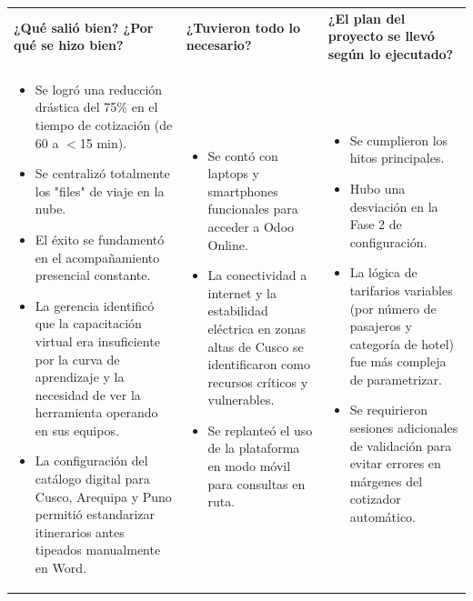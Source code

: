 \documentclass[11pt]{article}
\begin{document}
\begin{longtable}{|p{5.1cm}|p{5.1cm}|p{5.1cm}|}
\hline
\rowcolor{RoundGray}\multicolumn{3}{|l|}{\textbf{Primera Ronda}} \\ \hline
\rowcolor{HeaderGray}\textbf{¿Qué salió bien? ¿Por qué se hizo bien?} & \textbf{¿Tuvieron todo lo necesario?} & \textbf{¿El plan del proyecto se llevó según lo ejecutado?} \\ \hline
\begin{itemize}[leftmargin=*,nosep]
    \item Se logró una reducción drástica del 75\% en el tiempo de cotización (de 60 a $<$15 min).
    \item Se centralizó totalmente los "files" de viaje en la nube.
    \item El éxito se fundamentó en el acompañamiento presencial constante.
    \item La gerencia identificó que la capacitación virtual era insuficiente por la curva de aprendizaje y la necesidad de ver la herramienta operando en sus equipos.
    \item La configuración del catálogo digital para Cusco, Arequipa y Puno permitió estandarizar itinerarios antes tipeados manualmente en Word.
\end{itemize} &
\begin{itemize}[leftmargin=*,nosep]
    \item Se contó con laptops y smartphones funcionales para acceder a Odoo Online.
    \item La conectividad a internet y la estabilidad eléctrica en zonas altas de Cusco se identificaron como recursos críticos y vulnerables.
    \item Se replanteó el uso de la plataforma en modo móvil para consultas en ruta.
\end{itemize} &
\begin{itemize}[leftmargin=*,nosep]
    \item Se cumplieron los hitos principales.
    \item Hubo una desviación en la Fase 2 de configuración.
    \item La lógica de tarifarios variables (por número de pasajeros y categoría de hotel) fue más compleja de parametrizar.
    \item Se requirieron sesiones adicionales de validación para evitar errores en márgenes del cotizador automático.
\end{itemize} \\ \hline
\end{longtable}
\end{document}
